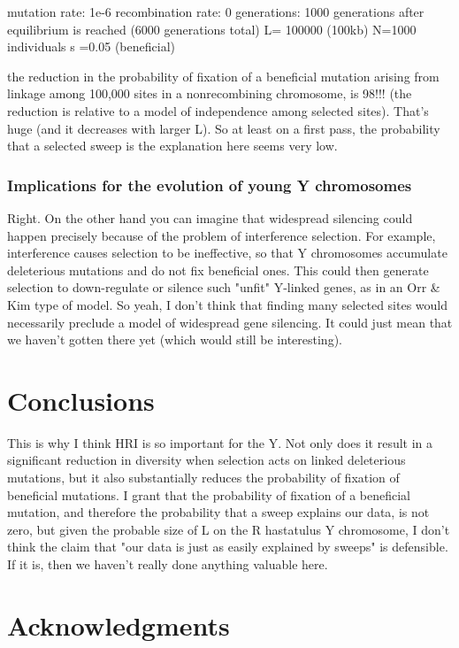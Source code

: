 \documentclass[9pt,twocolumn,twoside]{gsajnl}
\begin{document}
mutation rate: 1e-6
recombination rate: 0
generations: 1000 generations after equilibrium is reached (6000 generations total)
L= 100000 (100kb)
N=1000 individuals
s =0.05 (beneficial)

the reduction in the probability of fixation of a beneficial mutation arising from linkage among 100,000 sites in a nonrecombining chromosome, is 98!!! (the reduction is relative to a model of independence among  selected sites). That's huge (and it decreases with larger L). So at least on a first pass, the probability that a selected sweep is the explanation here seems very low.

\subsubsection*{Implications for the evolution of young Y chromosomes}
Right. On the other hand you can imagine that widespread silencing could happen precisely because of the problem of interference selection. For example, interference causes selection to be ineffective, so that Y chromosomes accumulate deleterious mutations and do not fix beneficial ones. This could then generate selection to down-regulate or silence such "unfit" Y-linked genes, as in an Orr & Kim type of model. So yeah, I don't think that finding many selected sites would necessarily preclude a model of widespread gene silencing. It could just mean that we haven't gotten there yet (which would still be interesting).

\section*{Conclusions}

This is why I think HRI is so important for the Y. Not only does it result in a significant reduction in diversity when selection acts on linked deleterious mutations, but it also substantially reduces the probability of fixation of beneficial mutations. I grant that the probability of fixation of a beneficial mutation, and therefore the probability that a sweep explains our data, is not zero, but given the probable size of L on the R hastatulus Y chromosome, I don't think the claim that "our data is just as easily explained by sweeps" is defensible. If it is, then we haven't really done anything valuable here.

\section*{Acknowledgments}


\end{document}
